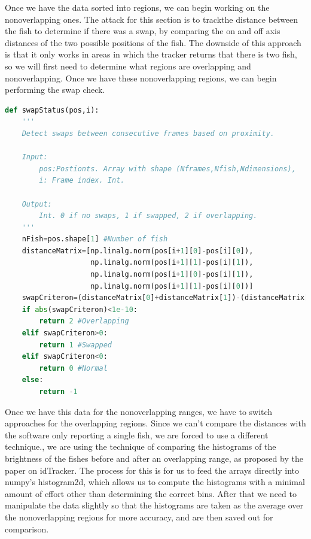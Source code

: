 \documentclass{article}
\begin{document}
Once we have the data sorted into regions, we can begin working on the nonoverlapping ones. The attack for this section is to trackthe distance between the fish to determine if there was a swap, by comparing the on and off axis distances of the two possible positions of the fish. The downside of this approach is that it only works in areas in which the tracker returns that there is two fish, so we will first need to determine what regions are overlapping and nonoverlapping. Once we have these nonoverlapping regions, we can begin performing the swap check. 

\begin{minipage}[c]{\textwidth}
\begin{lstlisting}[language=Python]
def swapStatus(pos,i):
    '''
    Detect swaps between consecutive frames based on proximity.
    
    Input:
        pos:Postionts. Array with shape (Nframes,Nfish,Ndimensions),
        i: Frame index. Int.
    
    Output:
        Int. 0 if no swaps, 1 if swapped, 2 if overlapping.
    '''
    nFish=pos.shape[1] #Number of fish
    distanceMatrix=[np.linalg.norm(pos[i+1][0]-pos[i][0]),
                    np.linalg.norm(pos[i+1][1]-pos[i][1]),
                    np.linalg.norm(pos[i+1][0]-pos[i][1]),
                    np.linalg.norm(pos[i+1][1]-pos[i][0])]
    swapCriteron=(distanceMatrix[0]+distanceMatrix[1])-(distanceMatrix[2]+distanceMatrix[3])
    if abs(swapCriteron)<1e-10:
        return 2 #Overlapping
    elif swapCriteron>0:
        return 1 #Swapped
    elif swapCriteron<0:
        return 0 #Normal
    else:
        return -1
\end{lstlisting}
\end{minipage}


Once we have this data for the nonoverlapping ranges, we have to switch approaches for the overlapping regions. Since we can't compare the distances with the software only reporting a single fish, we are forced to use a different technique., we are using the technique of comparing the histograms of the brightness of the fishes before and after an overlapping range, as proposed by the paper on idTracker\cite{idTracker}. The process for this is for us to feed the arrays directly into numpy's histogram2d, which allows us to compute the histograms with a minimal amount of effort other than determining the correct bins. After that we need to manipulate the data slightly so that the histograms are taken as the average over the nonoverlapping regions for more accuracy, and are then saved out for comparison.
\end{document}
